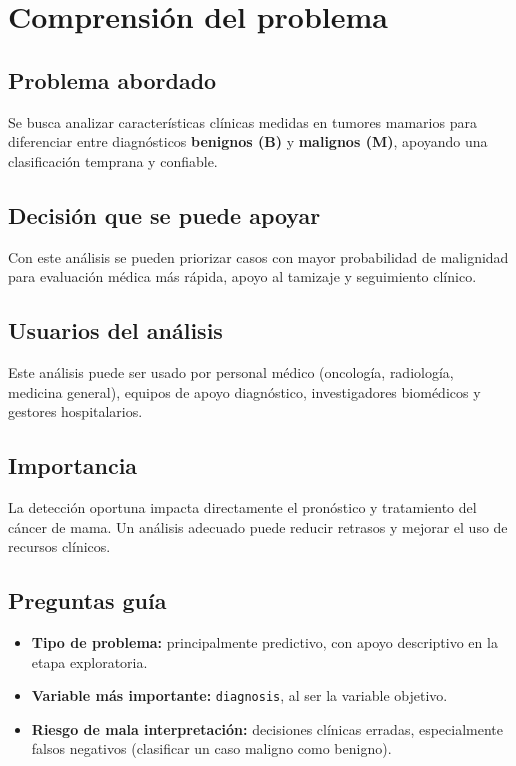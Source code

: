 \section{Comprensión del problema}

\subsection{Problema abordado}
Se busca analizar características clínicas medidas en tumores mamarios para diferenciar entre diagnósticos \textbf{benignos (B)} y \textbf{malignos (M)}, apoyando una clasificación temprana y confiable.

\subsection{Decisión que se puede apoyar}
Con este análisis se pueden priorizar casos con mayor probabilidad de malignidad para evaluación médica más rápida, apoyo al tamizaje y seguimiento clínico.

\subsection{Usuarios del análisis}
Este análisis puede ser usado por personal médico (oncología, radiología, medicina general), equipos de apoyo diagnóstico, investigadores biomédicos y gestores hospitalarios.

\subsection{Importancia}
La detección oportuna impacta directamente el pronóstico y tratamiento del cáncer de mama. Un análisis adecuado puede reducir retrasos y mejorar el uso de recursos clínicos.

\subsection{Preguntas guía}
\begin{itemize}
    \item \textbf{Tipo de problema:} principalmente predictivo, con apoyo descriptivo en la etapa exploratoria.
    \item \textbf{Variable más importante:} \texttt{diagnosis}, al ser la variable objetivo.
    \item \textbf{Riesgo de mala interpretación:} decisiones clínicas erradas, especialmente falsos negativos (clasificar un caso maligno como benigno).
\end{itemize}
